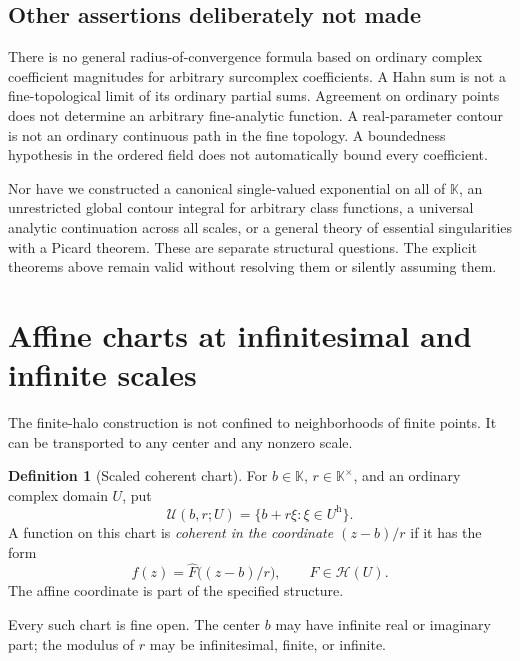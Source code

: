 \documentclass[11pt,a4paper]{article}
\theoremstyle{definition}\newtheorem{definition}[theorem]{Definition}
\theoremstyle{remark}\newtheorem{remark}[theorem]{Remark}
\newcommand{\K}{\mathbb K}
\newcommand{\A}{\mathscr H}\newcommand{\hol}{\mathcal O}
\newcommand{\ev}[1]{\widehat{#1}}
\newcommand{\halo}[1]{#1^{\mathrm h}}
\numberwithin{equation}{section}
\begin{document}
\subsection{Other assertions deliberately not made}
There is no general radius-of-convergence formula based on ordinary complex coefficient magnitudes for arbitrary surcomplex coefficients. A Hahn sum is not a fine-topological limit of its ordinary partial sums. Agreement on ordinary points does not determine an arbitrary fine-analytic function. A real-parameter contour is not an ordinary continuous path in the fine topology. A boundedness hypothesis in the ordered field does not automatically bound every coefficient.

Nor have we constructed a canonical single-valued exponential on all of $\K$, an unrestricted global contour integral for arbitrary class functions, a universal analytic continuation across all scales, or a general theory of essential singularities with a Picard theorem. These are separate structural questions. The explicit theorems above remain valid without resolving them or silently assuming them.

\section{Affine charts at infinitesimal and infinite scales}\label{sec:charts}
The finite-halo construction is not confined to neighborhoods of finite points. It can be transported to any center and any nonzero scale.

\begin{definition}[Scaled coherent chart]
For $b\in\K$, $r\in\K^\times$, and an ordinary complex domain $U$, put
\[
 \mathcal U(b,r;U)=\{b+r\xi:\xi\in\halo U\}.
\]
A function on this chart is \emph{coherent in the coordinate $(z-b)/r$} if it has the form
\[
 f(z)=\ev F\bigl((z-b)/r\bigr),\qquad F\in\A(U).
\]
The affine coordinate is part of the specified structure.
\end{definition}
Every such chart is fine open. The center $b$ may have infinite real or imaginary part; the modulus of $r$ may be infinitesimal, finite, or infinite.
\end{document}
